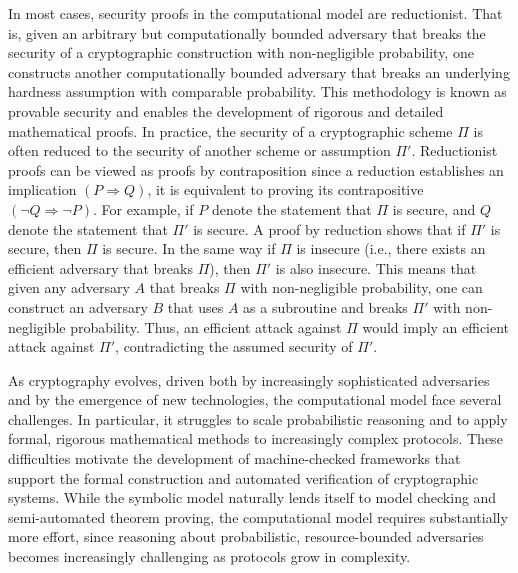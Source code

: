 In most cases, security proofs in the computational model are reductionist. That is, given an arbitrary but computationally bounded adversary that breaks the security of a cryptographic construction with non-negligible probability, one constructs another computationally bounded adversary that breaks an underlying hardness assumption with comparable probability. This methodology is known as provable security and enables the development of rigorous and detailed mathematical proofs. In practice, the security of a cryptographic scheme $\Pi$ is often reduced to the security of another scheme or assumption $\Pi'$. Reductionist proofs can be viewed as proofs by contraposition since a reduction establishes an implication $(P\Rightarrow Q)$, it is equivalent to proving its contrapositive $(\neg Q \Rightarrow \neg P)$. For example, if $P$ denote the statement that $\Pi$ is secure, and $Q$ denote the statement that $\Pi'$ is secure. A proof by reduction shows that if $\Pi'$ is secure, then $\Pi$ is secure. In the same way if $\Pi$ is insecure (i.e., there exists an efficient adversary that breaks $\Pi$), then $\Pi'$ is also insecure. This means that given any adversary $A$ that breaks $\Pi$ with non-negligible probability, one can construct an adversary $B$ that uses $A$ as a subroutine and breaks $\Pi'$ with non-negligible probability. Thus, an efficient attack against $\Pi$ would imply an efficient attack against $\Pi'$, contradicting the assumed security of $\Pi'$. 

As cryptography evolves, driven both by increasingly sophisticated adversaries and by the emergence of new technologies, the computational model face several challenges. In particular, it struggles to scale probabilistic reasoning and to apply formal, rigorous mathematical methods to increasingly complex protocols. These difficulties motivate the development of machine-checked frameworks that support the formal construction and automated verification of cryptographic systems. While the symbolic model naturally lends itself to model checking and semi-automated theorem proving, the computational model requires substantially more effort, since reasoning about probabilistic, resource-bounded adversaries becomes increasingly challenging as protocols grow in complexity.

